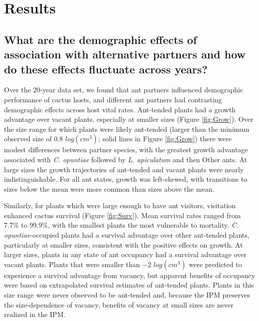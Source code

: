 \documentclass[11pt]{article}
\begin{document}
 
\section*{Results}
\subsection*{What are the demographic effects of association with alternative partners and how do these effects fluctuate across years?}
Over the 20-year data set, we found that ant partners influenced demographic performance of cactus hosts, and different ant partners had contrasting demographic effects across host vital rates. 
Ant-tended plants had a growth advantage over vacant plants, especially at smaller sizes (Figure \ref{fig:Grow}).
Over the size range for which plants were likely ant-tended (larger than the minimum observed size of $0.8$ $log(cm^3)$; solid lines in Figure \ref{fig:Grow}) there were modest differences between partner species, with the greatest growth advantage associated with \textit{C. opuntiae} followed by \textit{L. apiculatum} and then Other ants.
At large sizes the growth trajectories of ant-tended and vacant plants were nearly indistinguishable. 
For all ant states, growth was left-skewed, with transitions to sizes below the mean were more common than sizes above the mean. 

Similarly, for plants which were large enough to have ant visitors, visitation enhanced cactus survival (Figure \ref{fig:Surv}). 
Mean survival rates ranged from 7.7\% to 99.9\%, with the smallest plants the most vulnerable to mortality. 
\textit{C. opuntiae}-occupied plants had a survival advantage over other ant-tended plants, particularly at smaller sizes, consistent with the positive effects on growth. 
At larger sizes, plants in any state of ant occupancy had a survival advantage over vacant plants. 
Plants that were smaller than $-2$ $log(cm^3)$ were predicted to experience a survival advantage from vacancy, but apparent benefits of occupancy were based on extrapolated survival estimates of ant-tended plants. 
Plants in this size range were never observed to be ant-tended and, because the IPM preserves the size-dependence of vacancy, benefits of vacancy at small sizes are never realized in the IPM. 
\end{document}
